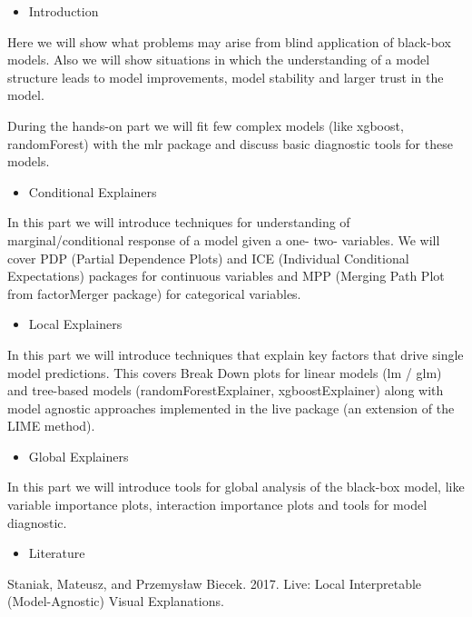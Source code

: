 \documentclass[]{book}
\providecommand{\tightlist}{%
  \setlength{\itemsep}{0pt}\setlength{\parskip}{0pt}}
\theoremstyle{definition}
\theoremstyle{definition}
\theoremstyle{definition}
\theoremstyle{remark}
\begin{document}
\begin{itemize}
\tightlist
\item
  Introduction
\end{itemize}

Here we will show what problems may arise from blind application of
black-box models. Also we will show situations in which the
understanding of a model structure leads to model improvements, model
stability and larger trust in the model.

During the hands-on part we will fit few complex models (like xgboost,
randomForest) with the mlr package and discuss basic diagnostic tools
for these models.

\begin{itemize}
\tightlist
\item
  Conditional Explainers
\end{itemize}

In this part we will introduce techniques for understanding of
marginal/conditional response of a model given a one- two- variables. We
will cover PDP (Partial Dependence Plots) and ICE (Individual
Conditional Expectations) packages for continuous variables and MPP
(Merging Path Plot from factorMerger package) for categorical variables.

\begin{itemize}
\tightlist
\item
  Local Explainers
\end{itemize}

In this part we will introduce techniques that explain key factors that
drive single model predictions. This covers Break Down plots for linear
models (lm / glm) and tree-based models (randomForestExplainer,
xgboostExplainer) along with model agnostic approaches implemented in
the live package (an extension of the LIME method).

\begin{itemize}
\tightlist
\item
  Global Explainers
\end{itemize}

In this part we will introduce tools for global analysis of the
black-box model, like variable importance plots, interaction importance
plots and tools for model diagnostic.

\begin{itemize}
\tightlist
\item
  Literature
\end{itemize}

Staniak, Mateusz, and Przemysław Biecek. 2017. Live: Local Interpretable
(Model-Agnostic) Visual Explanations.
\end{document}
